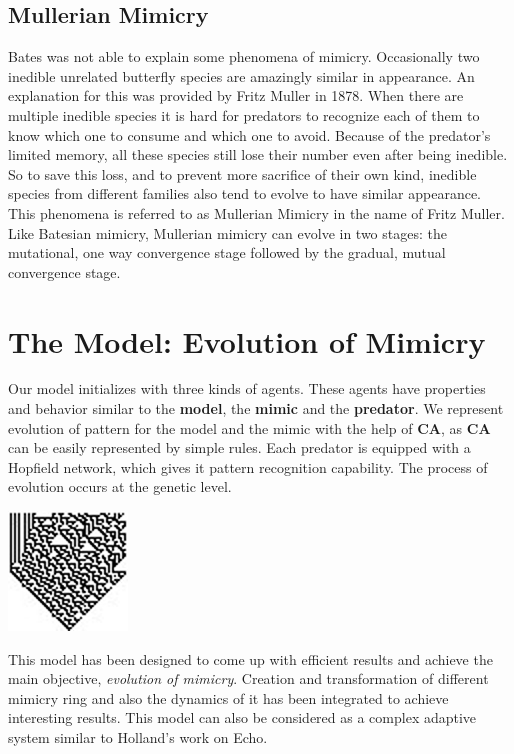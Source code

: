 \documentclass[a0,portrait]{a0poster}
\begin{document}
\begin{multicols}{2}
\subsection*{Mullerian Mimicry}
Bates was not able to explain some phenomena of mimicry. Occasionally two inedible unrelated butterfly species are amazingly similar in appearance. An explanation for this was provided by Fritz Muller in 1878. When there are multiple inedible species it is hard for predators to recognize each of them to know which one to consume and which one to avoid. Because of the predator's limited memory, all these species still lose their number even after being inedible. So to save this loss, and to prevent more sacrifice of their own kind, inedible species from different families also tend to evolve to have similar appearance. This phenomena is referred to as Mullerian Mimicry in the name of Fritz Muller. Like Batesian mimicry, Mullerian mimicry can evolve in two stages: the mutational, one way convergence stage followed by the gradual, mutual convergence stage.

\section*{The Model: Evolution of Mimicry}

Our model initializes with three kinds of agents. These agents have properties and behavior similar to the \textbf{model}, the \textbf{mimic} and the \textbf{predator}. We represent evolution of pattern for the model and the mimic with the help of \textbf{CA}, as \textbf{CA} can be easily represented by simple rules. Each predator is equipped with a Hopfield network, which gives it pattern recognition capability. The process of evolution occurs at the genetic level. 

\begin{center}\vspace{1cm}
\includegraphics[width=0.1\linewidth]{CARule30-large.jpg}
\end{center}\vspace{1cm}

This model has been designed to come up with efficient results and achieve the main objective, \textit{evolution of mimicry}. Creation and transformation of different mimicry ring and also the dynamics of it has been integrated to achieve interesting results. This model can also be considered as a complex adaptive system similar to Holland's work on Echo.


\end{multicols}
\end{document}

